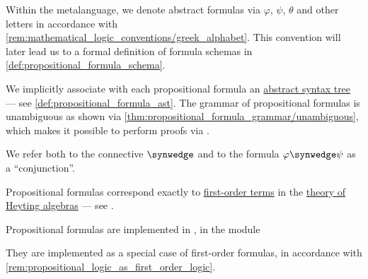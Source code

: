 \begin{comments}
  \item Within the metalanguage, we denote abstract formulas via \( \varphi \), \( \psi \), \( \theta \) and other letters in accordance with \cref{rem:mathematical_logic_conventions/greek_alphabet}. This convention will later lead us to a formal definition of formula schemas in \cref{def:propositional_formula_schema}.

  \item We implicitly associate with each propositional formula an \hyperref[con:abstract_syntax_tree]{abstract syntax tree} --- see \cref{def:propositional_formula_ast}. The grammar of propositional formulas is unambiguous as shown via \cref{thm:propositional_formula_grammar/unambiguous}, which makes it possible to perform proofs via .

  \item We refer both to the connective \( {\synwedge} \) and to the formula \( \varphi \synwedge \psi \) as a \enquote{conjunction}.

  \item Propositional formulas correspond exactly to \hyperref[def:fol_term]{first-order terms} in the \hyperref[def:heyting_algebra/theory]{theory of Heyting algebras} --- see .

  \item Propositional formulas are implemented in \cite{notebook:code}, in the module
  \begin{CodeRefDisplay}
  \end{CodeRefDisplay}

  They are implemented as a special case of first-order formulas, in accordance with \cref{rem:propositional_logic_as_first_order_logic}.
\end{comments}


